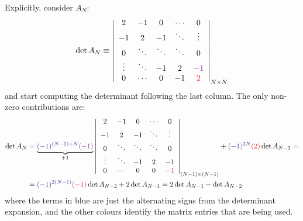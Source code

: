 \documentclass[../template.tex]{subfiles}
\begin{document}
Explicitly, consider $A_N$:
\begin{align*}
    \operatorname{det}A_N \equiv \left|\begin{array}{ccccc}
    2 & -1 & 0 & \cdots & 0 \\ 
    -1 & 2 & -1 & \ddots & \vdots \\ 
    0 & \ddots & \ddots & \ddots & 0 \\ 
    \vdots & \ddots & -1 & 2 & \textcolor{Purple}{-1} \\ 
    0 & \cdots & 0 & -1 & \textcolor{Red}{2}
    \end{array}\right|_{N\times N}
\end{align*} 
and start computing the determinant following the last column. The only non-zero contributions are:
\begin{align}\nonumber
    \operatorname{det} A_N &= \underbrace{\textcolor{Blue}{(-1)^{(N-1) + N}} \textcolor{Purple}{(-1)}}_{+1} \left|\begin{array}{ccccc}
    2 & -1 & 0 & \cdots & 0 \\ 
    -1 & 2 & -1 & \ddots & \vdots \\ 
    0 & \ddots & \ddots & \ddots & 0 \\ 
    \vdots & \ddots & -1 & 2 & -1 \\ 
    0 & \cdots & 0 & 0 & \textcolor{Magenta}{-1}
    \end{array}\right|_{(N-1)\times (N-1)} + \textcolor{Blue}{(-1)^{2N}} \textcolor{Red}{(2)} \operatorname{det} A_{N-1} =\\
    &= \textcolor{Blue}{(-1)^{2(N-1)}} \textcolor{Magenta}{(-1)} \operatorname{det} A_{N-2}  + 2 \operatorname{det}A_{N-1} = 2 \operatorname{det}A_{N-1} - \operatorname{det} A_{N-2}   
    \label{eqn:recurrence}
\end{align}
where the terms in blue are just the alternating signs from the determinant expansion, and the other colours identify the matrix entries that are being used.
\end{document}

